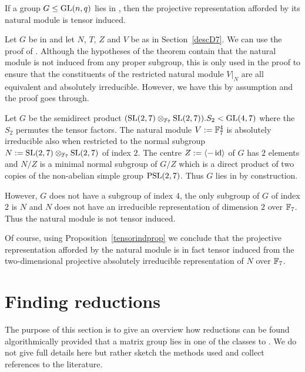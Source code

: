 \begin{Prop}
    \label{tensorindprop}
If a group $G \le \GL(n,q)$ lies in , then the projective
representation afforded by its natural module is tensor induced.
\end{Prop}
\proofbeg
Let $G$ be in  and let $N$, $T$, $Z$ and $V$ be as in
Section~\ref{descD7}.
We can use the proof of \cite[Tensor Induction Theorem]{kovacs}. 
Although the hypotheses of
the theorem contain that the natural module is not induced from any
proper subgroup, this is only used in the proof to ensure that the
constituents of the restricted natural module $V|_N$ are all
equivalent and absolutely irreducible. However, we have this by
assumption and the proof goes through.
\proofend

\begin{Rem}
    \label{nottensorind}
    Let $G$ be the semidirect product 
    $(\SL(2,7) \otimes_{\F_7} \SL(2,7)).S_2 < \GL(4,7)$ where the
    $S_2$ permutes the tensor factors. The natural module $V := \mathbb{F}_7^4$ is
    absolutely irreducible also when restricted to the normal subgroup
    $N := \SL(2,7) \otimes_{\F_7} \SL(2,7)$ of index $2$. The centre 
    $Z := \left< -\id \right>$ of $G$ has $2$ elements and $N/Z$ is a
    minimal normal subgroup of $G/Z$ which is a direct product of two
    copies of the non-abelian simple group $\PSL(2,7)$. Thus $G$ lies
    in  by construction.

    However, $G$ does not have a subgroup of index $4$, the only 
    subgroup of $G$ of index $2$ is $N$ and $N$ does
    not have an irreducible representation of dimension $2$ over
    $\mathbb{F}_7$. Thus the natural module is not tensor induced.

    Of course, using Proposition~\ref{tensorindprop} we conclude that
    the projective representation afforded by the natural module is in
    fact tensor induced from the two-dimensional projective
    absolutely irreducible representation of $N$ over $\mathbb{F}_7$.
\end{Rem}

\section{Finding reductions}
\label{findred}

The purpose of this section is to give an overview how reductions can
be found algorithmically provided that a matrix group
lies in one of the classes  to . We do not give full details
here but rather sketch the methods used and collect references to the
literature.

